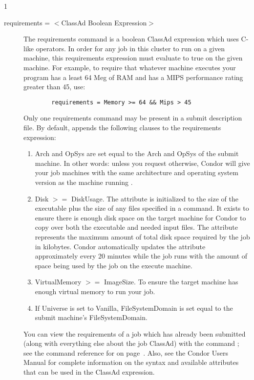 \begin{ManPage}{\label{man-condor-submit}}{1}
\begin{description}
\item[requirements = $<$ClassAd Boolean Expression$>$] The requirements
command is a boolean ClassAd expression which uses C-like operators. In
order for any job in this cluster to run on a given machine, this
requirements expression must evaluate to true on the given machine. For
example, to require that whatever machine executes your program has a
least 64 Meg of RAM and has a MIPS performance rating greater than 45,
use: 
\begin{verbatim}
        requirements = Memory >= 64 && Mips > 45
\end{verbatim}
Only one requirements command may be present in a
submit description file.
By default,  appends the following clauses to
the requirements expression:
\begin{enumerate}
	\item Arch and OpSys are set equal to the Arch and OpSys of the
submit machine.  In other words: unless you request otherwise, Condor will give your
job machines with the same architecture and operating system version as
the machine running .
	\item Disk $>=$ DiskUsage. 
The  attribute is initialized to the size of the
executable plus the size of any files specified in a
 command.
It exists to ensure there is enough disk space on the 
target machine for Condor to copy over both the executable
and needed input files.
The  attribute represents the maximum amount of
total disk space required by the job in kilobytes.
Condor automatically updates the  attribute
approximately every 20 minutes while the job runs with the
amount of space being used by the job on the execute machine.  
	\item VirtualMemory $>=$ ImageSize.  To ensure the target machine
has enough virtual memory to run your job.
	\item If Universe is set to Vanilla, FileSystemDomain is set equal to
the submit machine's FileSystemDomain.
\end{enumerate}
You can view the requirements of a job
which has already been submitted (along with everything else about the
job ClassAd) with the command ; see the command reference for
 on page~\pageref{man-condor-q}.  Also, see the Condor Users
Manual for complete information on the syntax and available attributes
that can be used in the ClassAd expression.




\end{description}
\end{ManPage}
